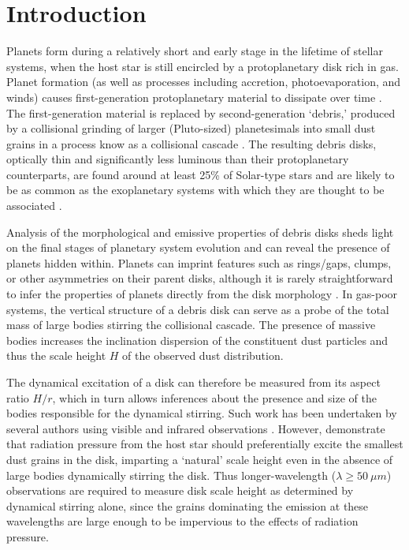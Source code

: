 \documentclass[modern]{aastex62}
\begin{document}
\section{Introduction}
\label{section: introduction}

Planets form during a relatively short and early stage in the lifetime of stellar systems,  when the host star is still encircled by a protoplanetary disk rich in gas. 
Planet formation (as well as processes including accretion, photoevaporation, and winds) causes first-generation protoplanetary material to dissipate over time \citep{williams&cieza11,ercolano&pascucci17}.
The first-generation material is replaced by second-generation `debris,' produced by a collisional grinding of larger (Pluto-sized) planetesimals into small dust grains in a process know as a collisional cascade \citep{wyatt2008}. 
The resulting debris disks, optically thin and significantly less luminous than their protoplanetary counterparts, are found around at least 25\% of Solar-type stars and are likely to be as common as the exoplanetary systems with which they are thought to be associated \citep{montesinos16}.

Analysis of the morphological and emissive properties of debris disks sheds light on the final stages of planetary system evolution and can reveal the presence of planets hidden within.
Planets can imprint features such as rings/gaps, clumps, or other asymmetries on their parent disks, although it is rarely straightforward to infer the properties of planets directly from the disk morphology \citep{hughes18}.
In gas-poor systems, the vertical structure of a debris disk can serve as a probe of the total mass of large bodies stirring the collisional cascade.
The presence of massive bodies increases the inclination dispersion  of the constituent dust particles and thus the scale height $H$ of the observed dust distribution.

The dynamical excitation of a disk can therefore be measured from its aspect ratio $H/r$, which in turn allows inferences about the presence and size of the bodies responsible for the dynamical stirring.
Such work has been undertaken by several authors using visible and infrared observations \citep{artymowicz97,thebault&augereau07,quillen07}.
However, \cite{thebault09} demonstrate that radiation pressure from the host star should preferentially excite the smallest dust grains in the disk, imparting a `natural' scale height even in the absence of large bodies dynamically stirring the disk. 
Thus longer-wavelength ($\lambda \geq \SI{50}{\mu m}$) observations are required to measure disk scale height as determined by dynamical stirring alone, since the grains dominating the emission at these wavelengths are large enough to be impervious to the effects of radiation pressure.
\end{document}
